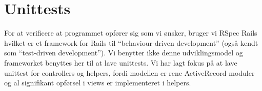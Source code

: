 \section{Unittests}
\label{sec:unittests}
For at verificere at programmet opfører sig som vi ønsker, bruger vi RSpec Rails hvilket er et framework for Rails til ``behaviour-driven development'' (også kendt som ``test-driven development''). Vi benytter ikke denne udviklingsmodel og frameworket benyttes her til at lave unittests.
Vi har lagt fokus på at lave unittest for controllers og helpers, fordi modellen er rene ActiveRecord moduler og al signifikant opførsel i views er implementeret i helpers.